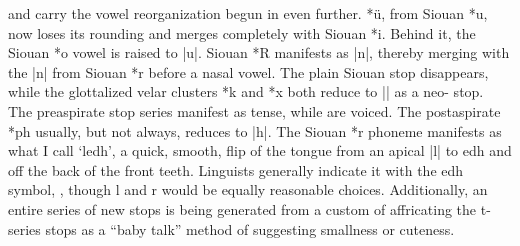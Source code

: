 \documentclass[output=paper]{LSP/langsci}
\begin{document}

 and  carry the vowel reorganization begun in  even further.   *\"u, from Siouan *u, now loses its rounding and merges completely with Siouan *i.  Behind it, the Siouan *o vowel is raised to |u|.  Siouan *R manifests as |n|, thereby merging with the |n| from Siouan *r before a nasal vowel.  The plain Siouan  stop disappears, while the glottalized velar clusters *k\textsuperscript{} and *x\textsuperscript{} both reduce to |\textsuperscript{}| as a neo- stop.  The preaspirate stop series manifest as tense, while  are voiced.  The postaspirate *ph usually, but not always, reduces to |h|.  The Siouan *r phoneme manifests as what I call `ledh', a quick, smooth, flip of the tongue from an apical |l| to edh and off the back of the front teeth.  Linguists generally indicate it with the edh symbol, , though l and r would be equally reasonable choices.  Additionally, an entire series of new stops is being generated from a custom of affricating the t-series stops as a ``baby talk'' method of suggesting smallness or cuteness.
\end{document}
